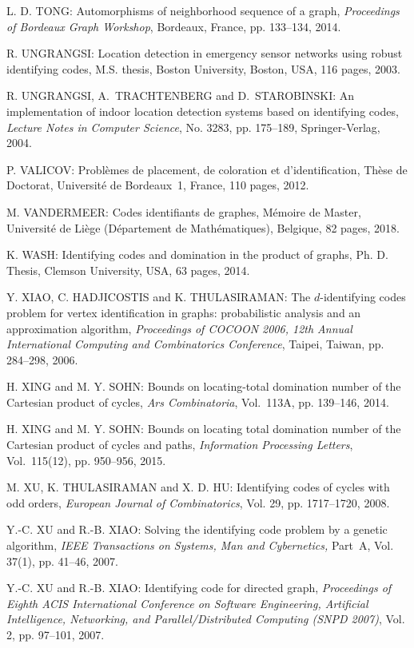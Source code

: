 \begin{thebibliography}{999}
L. D. TONG: Automorphisms of neighborhood sequence of a graph, {\it Proceedings of Bordeaux Graph Workshop}, Bordeaux, France, pp. 133--134, 2014.

R. UNGRANGSI: Location detection in emergency sensor networks using robust identifying codes, M.S. thesis, Boston University, Boston, USA, 116 pages, 2003.

R. UNGRANGSI, A.~TRACHTENBERG and D.~STAROBINSKI: An implementation of indoor location detection systems based on identifying codes, {\it Lecture Notes in Computer Science}, No. 3283, pp. 175--189, Springer-Verlag, 2004.

P. VALICOV: Probl\`emes de placement, de coloration et d'identification, Th\`ese de Doctorat, Universit\'e de Bordeaux~1, France, 110 pages, 2012.

M. VANDERMEER: Codes identifiants de graphes, M\'emoire de Master, Universit\'e de Li\`ege (D\'epartement de Math\'e\-matiques), Belgique, 82 pages, 2018.

K. WASH: Identifying codes and domination in the product of graphs, Ph. D. Thesis, Clemson University, USA, 63 pages, 2014.

Y. XIAO, C. HADJICOSTIS and K. THULASIRAMAN: The $d$-identifying codes problem for vertex identification in graphs: probabilistic analysis and an approximation algorithm, {\it Proceedings of COCOON 2006, 12th Annual International Computing and Combinatorics Conference}, Taipei, Taiwan, pp. 284--298, 2006.

H. XING and M. Y. SOHN: Bounds on locating-total domination number of the Cartesian product of cycles, {\it Ars Combinatoria}, Vol.~113A, pp. 139--146, 2014. 

H. XING and M. Y. SOHN: Bounds on locating total domination number of the Cartesian product of cycles and paths, {\it Information Processing Letters}, Vol.~115(12), pp. 950--956, 2015.
  
M. XU, K. THULASIRAMAN and X. D. HU: Identifying codes of cycles with odd orders, {\it European Journal of Combinatorics}, Vol. 29, pp. 1717--1720, 2008.

Y.-C. XU and R.-B. XIAO: Solving the identifying code problem by a genetic algorithm, {\it IEEE Transactions on Systems, Man and Cybernetics,} Part~A, Vol. 37(1), pp. 41--46, 2007. 

Y.-C. XU and R.-B. XIAO: Identifying code for directed graph, {\it Proceedings of Eighth ACIS International Conference on Software Engineering, Artificial Intelligence, Networking, and Parallel/Distributed Computing (SNPD 2007)}, Vol. 2, pp. 97--101, 2007.


\end{thebibliography}
